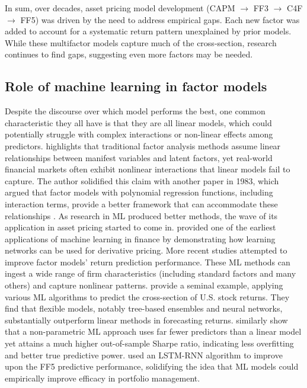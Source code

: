 In sum, over decades, asset pricing model development (CAPM $\rightarrow$ FF3 $\rightarrow$ C4F $\rightarrow$ FF5) was driven by the need to address empirical gaps. Each new factor was added to account for a systematic return pattern unexplained by prior models. While these multifactor models capture much of the cross-section, research continues to find gaps, suggesting even more factors may be needed.


\subsection{Role of machine learning in factor models}

Despite the discourse over which model performs the best, one common characteristic they all have is that they are all linear models, which could potentially struggle with complex interactions or non-linear effects among predictors.  highlights that traditional factor analysis methods assume linear relationships between manifest variables and latent factors, yet real-world financial markets often exhibit nonlinear interactions that linear models fail to capture. The author solidified this claim with another paper in 1983, which argued that factor models with polynomial regression functions, including interaction terms, provide a better framework that can accommodate these relationships \cite{mcdonald_1983}. As research in ML produced better methods, the wave of its application in asset pricing started to come in.  provided one of the earliest applications of machine learning in finance by demonstrating how learning networks can be used for derivative pricing. More recent studies attempted to improve factor models' return prediction performance. These ML methods can ingest a wide range of firm characteristics (including standard factors and many others) and capture nonlinear patterns.  provide a seminal example, applying various ML algorithms to predict the cross-section of U.S. stock returns. They find that flexible models, notably tree-based ensembles and neural networks, substantially outperform linear methods in forecasting returns.  similarly show that a non-parametric ML approach uses far fewer predictors than a linear model yet attains a much higher out-of-sample Sharpe ratio, indicating less overfitting and better true predictive power.  used an LSTM-RNN algorithm to improve upon the FF5 predictive performance, solidifying the idea that ML models could empirically improve efficacy in portfolio management.

